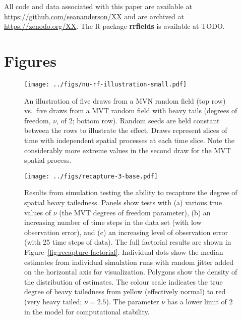 \documentclass[12pt,english]{article}
\begin{document}
\begin{spacing}{1.3}
All code and data associated with this paper are available at
\url{https://github.com/seananderson/XX} and are archived at
\url{https://zenodo.org/XX}.
The R package \textbf{rrfields} is available at TODO.



\clearpage

\section{Figures}

\begin{figure}[htb]
  \begin{center}
    \texttt{[image: ../figs/nu-rf-illustration-small.pdf]}
    \caption{An illustration of five draws from a MVN random field (top row)
      vs.\ five draws from a MVT random field with heavy tails
      (degrees of freedom, $\nu$, of 2; bottom row). Random seeds are held constant
      between the rows
      to illustrate the effect. Draws represent slices of time with independent spatial
      processes at each time slice. Note the considerably more extreme values in
      the second draw for the MVT spatial process.}
    \label{fig:nu}
  \end{center}
\end{figure}

\clearpage

\begin{figure}[htb]
  \begin{center}
    \texttt{[image: ../figs/recapture-3-base.pdf]}
    \caption{Results from simulation testing the ability to recapture the degree
      of spatial heavy tailedness. Panels show
      tests with (a) various true values of $\nu$ (the MVT degrees of freedom parameter),
      (b) an increasing number of time steps in the data set (with low observation error),
      and (c) an increasing level of observation error (with 25 time steps of data).
      The full factorial results are shown in Figure~\ref{fig:recapture-factorial}.
      Individual dots show the median estimates from individual simulation runs
      with random jitter added on the horizontal axis for visualization.
      Polygons show the density of the distribution of estimates.
      The colour scale indicates the true degree of heavy tailedness from
      yellow (effectively normal) to red (very heavy tailed; $\nu = 2.5$).
      The parameter $\nu$ has a lower limit of $2$ in the model
      for computational stability.
    }
    \label{fig:recapture}
  \end{center}
\end{figure}


\end{spacing}
\end{document}
